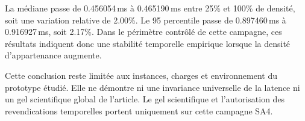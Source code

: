 La médiane passe de 0.456054\,ms à 0.465190\,ms entre 25\% et 100\% de densité, soit une variation relative de 2.00\%. Le 95\ieme{} percentile passe de 0.897460\,ms à 0.916927\,ms, soit 2.17\%. Dans le périmètre contrôlé de cette campagne, ces résultats indiquent donc une stabilité temporelle empirique lorsque la densité d'appartenance augmente.

Cette conclusion reste limitée aux instances, charges et environnement du prototype étudié. Elle ne démontre ni une invariance universelle de la latence ni un gel scientifique global de l'article. Le gel scientifique et l'autorisation des revendications temporelles portent uniquement sur cette campagne SA4.
